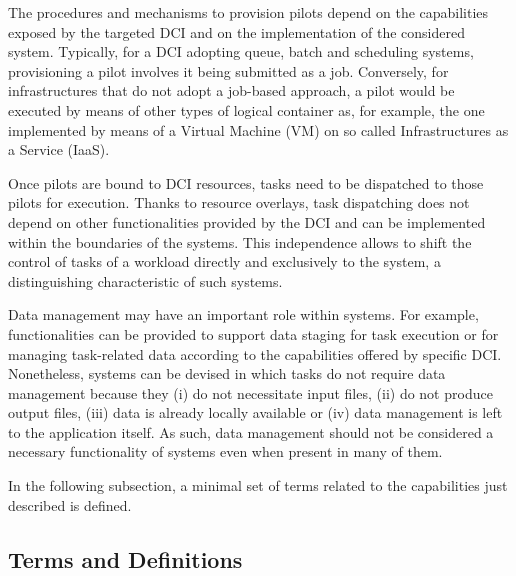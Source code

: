 \documentclass{sig-alternate}
\begin{document}
The procedures and mechanisms to provision pilots depend on the capabilities
exposed by the targeted DCI and on the implementation of the considered \pilot
system. Typically, for a DCI adopting queue, batch and scheduling systems,
provisioning a pilot involves it being submitted as a job. Conversely, for
infrastructures that do not adopt a job-based approach, a pilot would
be executed by means of other types of logical container as, for example, the
one implemented by means of a Virtual Machine (VM) on so called
Infrastructures as a Service (IaaS).

Once pilots are bound to DCI resources, tasks need to be dispatched to those
pilots for execution. Thanks to resource overlays, task dispatching does not
depend on other functionalities provided by the DCI and can be implemented
within the boundaries of the \pilot systems. This independence allows to shift
the control of tasks of a workload directly and exclusively to the \pilot
system, a distinguishing characteristic of such systems.

Data management may have an important role within \pilot systems. For example,
functionalities can be provided to support data staging for task execution or
for managing task-related data according to the capabilities offered by
specific DCI. Nonetheless, \pilot systems can be devised in which tasks do not
require data management because they (i) do not necessitate input files, (ii)
do not produce output files, (iii) data is already locally available or (iv)
data management is left to the application itself. As such, data management
should not be considered a necessary functionality of \pilot systems even when
present in many of them.

In the following subsection, a minimal set of terms related to the
capabilities just described is defined.

\subsection{Terms and Definitions}
\label{subsec:vocab_terms_and_definitions}
\end{document}
